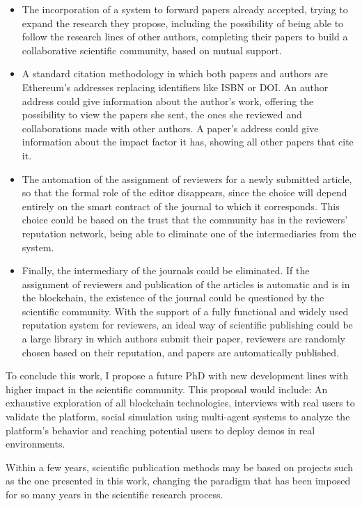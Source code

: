 \begin{itemize}
\item The incorporation of a system to forward papers already accepted, trying
  to expand the research they propose, including the possibility of being able
  to follow the research lines of other authors, completing their papers to
  build a collaborative scientific community, based on mutual support.
\item A standard citation methodology in which both papers and authors are
  Ethereum's addresses replacing identifiers like ISBN or DOI. An author address
  could give information about the author's work, offering the possibility to
  view the papers she sent, the ones she reviewed and collaborations made with
  other authors. A paper's address could give information about the impact
  factor it has, showing all other papers that cite it.
\item The automation of the assignment of reviewers for a newly submitted
  article, so that the formal role of the editor disappears, since the choice
  will depend entirely on the smart contract of the journal to which it
  corresponds. This choice could be based on the trust that the community has in
  the reviewers' reputation network, being able to eliminate one of the
  intermediaries from the system.
\item Finally, the intermediary of the journals could be eliminated. If the
  assignment of reviewers and publication of the articles is automatic and is in
  the blockchain, the existence of the journal could be questioned by the
  scientific community. With the support of a fully functional and widely used
  reputation system for reviewers, an ideal way of scientific publishing could
  be a large library in which authors submit their paper, reviewers are randomly
  chosen based on their reputation, and papers are automatically published.
\end{itemize}

To conclude this work, I propose a future PhD with new development lines with
higher impact in the scientific community. This proposal would include: An
exhaustive exploration of all blockchain technologies, interviews with real
users to validate the platform, social simulation using multi-agent systems to
analyze the platform's behavior and reaching potential users to deploy demos in
real environments.

Within a few years, scientific publication methods may be based on projects such
as the one presented in this work, changing the paradigm that has been imposed
for so many years in the scientific research process.

